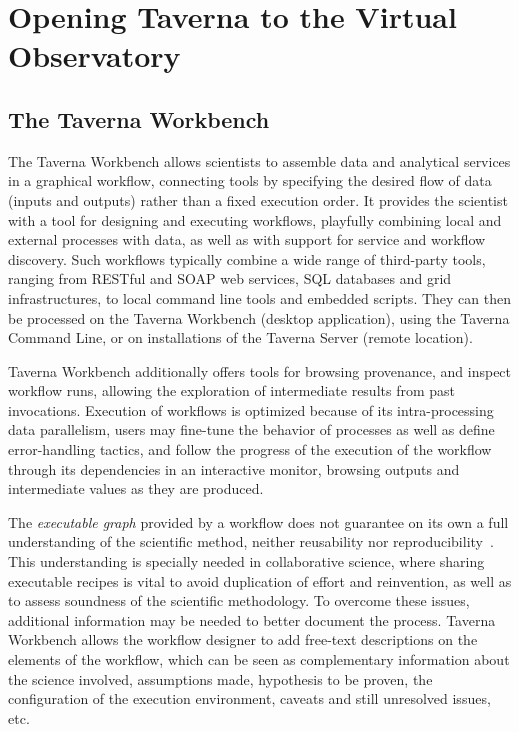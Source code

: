 \documentclass{aa}
\begin{document}
\section{Opening Taverna to the Virtual Observatory}
\label{Materials}

\subsection{The Taverna Workbench}
\label{TavernaWorkbench}

The Taverna Workbench allows scientists to assemble data and analytical services in a graphical workflow, connecting tools by specifying the desired flow of data (inputs and outputs) rather than a fixed execution order. It provides the scientist with a tool for designing and executing workflows, playfully combining local and external processes with data, as well as with support for service and workflow discovery. Such workflows typically combine a wide range of third-party tools, ranging from RESTful and SOAP web services, SQL databases and grid infrastructures, to local command line tools and embedded scripts. They can then be processed on the Taverna Workbench (desktop application), using the Taverna Command Line, or on installations of the Taverna Server (remote location).

Taverna Workbench additionally offers tools for browsing provenance, and inspect workflow runs, allowing the exploration of intermediate results from past invocations. Execution of workflows is optimized because of its intra-processing data parallelism, users may fine-tune the behavior of processes as well as define error-handling tactics, and follow the progress of the execution of the workflow through its dependencies in an interactive monitor, browsing outputs and intermediate values as they are produced.

The \textit{executable graph} provided by a workflow does not guarantee on its own a full understanding of the scientific method, neither reusability nor reproducibility~\citep{WfRO:SePublica2012}. This understanding is specially needed in collaborative science, where sharing executable recipes is vital to avoid duplication of effort and reinvention, as well as to assess soundness of the scientific methodology. To overcome these issues, additional information may be needed to better document the process. Taverna Workbench allows the workflow designer to add free-text descriptions on the elements of the workflow, which can be seen as complementary information about the science involved, assumptions made, hypothesis to be proven, the configuration of the execution environment, caveats and still unresolved issues, etc.
\end{document}
